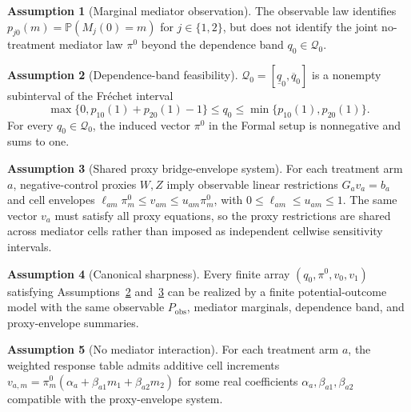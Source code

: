 \documentclass[11pt]{article}
\renewcommand{\Pr}{\mathbb{P}}
\theoremstyle{definition}
\newtheorem{assumption}{Assumption}
\theoremstyle{plain}
\theoremstyle{remark}
\begin{document}
\begin{assumption}[Marginal mediator observation]\label{ass:marginal-mediators}
The observable law identifies \(p_{j0}(m)=\Pr(M_j(0)=m)\) for
\(j\in\{1,2\}\), but does not identify the joint no-treatment mediator law
\(\pi^0\) beyond the dependence band \(q_0\in\mathcal Q_0\).
\end{assumption}

\begin{assumption}[Dependence-band feasibility]\label{ass:dependence-band}
\(\mathcal Q_0=[\underline q_0,\overline q_0]\) is a nonempty subinterval of
the Fréchet interval
\[
\max\{0,p_{10}(1)+p_{20}(1)-1\}\le q_0\le \min\{p_{10}(1),p_{20}(1)\}.
\]
For every \(q_0\in\mathcal Q_0\), the induced vector \(\pi^0\) in the Formal
setup is nonnegative and sums to one.
\end{assumption}

\begin{assumption}[Shared proxy bridge-envelope system]\label{ass:proxy-envelope}
For each treatment arm \(a\), negative-control proxies \(W,Z\) imply observable
linear restrictions \(G_a v_a=b_a\) and cell envelopes
\(\ell_{am}\pi^0_m\le v_{am}\le u_{am}\pi^0_m\), with
\(0\le\ell_{am}\le u_{am}\le1\).  The same vector \(v_a\) must satisfy all
proxy equations, so the proxy restrictions are shared across mediator cells
rather than imposed as independent cellwise sensitivity intervals.
\end{assumption}

\begin{assumption}[Canonical sharpness]\label{ass:canonical-sharpness}
Every finite array \((q_0,\pi^0,v_0,v_1)\) satisfying
Assumptions~\ref{ass:dependence-band} and~\ref{ass:proxy-envelope} can be
realized by a finite potential-outcome model with the same observable
\(P_{\mathrm{obs}}\), mediator marginals, dependence band, and proxy-envelope
summaries.
\end{assumption}

\begin{assumption}[No mediator interaction]\label{ass:no-interaction}
For each treatment arm \(a\), the weighted response table admits additive cell
increments \(v_{a,m}=\pi^0_m(\alpha_a+\beta_{a1}m_1+\beta_{a2}m_2)\) for
some real coefficients \(\alpha_a,\beta_{a1},\beta_{a2}\) compatible with the
proxy-envelope system.
\end{assumption}
\end{document}
